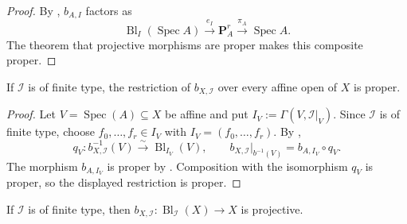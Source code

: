 \begin{proof}
  By , $b_{A,I}$ factors as
  \[
    \operatorname{Bl}_I(\operatorname{Spec}A)
      \xrightarrow{e_I}\mathbf P_A^r
      \xrightarrow{\pi_A}\operatorname{Spec}A.
  \]
  The theorem that projective morphisms are proper makes this composite
  proper.
\end{proof}

\begin{lemma}
  \label{lemma:nagata-global-blowup-proper-local}
  \lean{}

  If $\mathcal I$ is of finite type, the restriction of
  $b_{X,\mathcal I}$ over every affine open of $X$ is proper.
\end{lemma}

\begin{proof}
  Let $V=\operatorname{Spec}(A)\subseteq X$ be affine and put
  $I_V:=\Gamma(V,\mathcal I|_V)$.  Since $\mathcal I$ is of finite type,
  choose $f_0,\ldots,f_r\in I_V$ with $I_V=(f_0,\ldots,f_r)$.  By
  ,
  \[
    q_V\colon b_{X,\mathcal I}^{-1}(V)
      \xrightarrow{\sim}\operatorname{Bl}_{I_V}(V),
    \qquad
    b_{X,\mathcal I}|_{b^{-1}(V)}
      =b_{A,I_V}\circ q_V.
  \]
  The morphism $b_{A,I_V}$ is proper by
  .  Composition with the isomorphism
  $q_V$ is proper, so the displayed restriction is proper.
\end{proof}

\begin{theorem}
  \label{thm:nagata-global-blowup-projective}
  \lean{}

  If \(\mathcal I\) is of finite type, then
  \(b_{X,\mathcal I}\colon\operatorname{Bl}_{\mathcal I}(X)\to X\) is
  projective.
\end{theorem}

